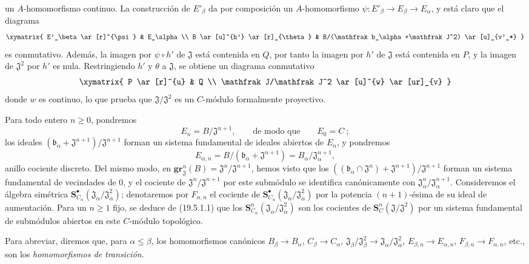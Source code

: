 \begin{env}[19.5.6.1]
un $A$-homomorfismo continuo. La construcción de $E'_\beta$ da por
composición un $A$-homomorfismo $\psi:E'_\beta\to E_\beta\to E_\alpha$, y
está claro que el diagrama
\[
  \xymatrix{
    E'_\beta \ar[r]^{\psi} & E_\alpha \\
    B \ar[u]^{h'} \ar[r]_{\theta} &
    B/(\mathfrak b_\alpha+\mathfrak J^2) \ar[u]_{v'_*}
  }
\]
es conmutativo. Además, la imagen por $\psi\circ h'$ de $\mathfrak J$ está
contenida en $Q$, por tanto la imagen por $h'$ de $\mathfrak J$ está contenida en
$P$, y la imagen de $\mathfrak J^2$ por $h'$ es nula. Restringiendo $h'$ y
$\theta$ a $\mathfrak J$, se obtiene un diagrama conmutativo
\[
  \xymatrix{
    P \ar[r]^{u} & Q \\
    \mathfrak J/\mathfrak J^2 \ar[u]^{w} \ar[ur]_{v}
  }
\]
donde $w$ es continuo, lo que prueba que
$\mathfrak J/\mathfrak J^2$ es un $C$-módulo formalmente proyectivo.
\end{env}



\begin{env}[19.5.6.2]
\label{0.19.5.6.2-fr}
Para todo entero $n\geq0$, pondremos
\[
  E_n=B/\mathfrak J^{n+1},
  \qquad\text{de modo que}\qquad E_0=C~;
\]
los ideales $(\mathfrak b_\alpha+\mathfrak J^{n+1})/\mathfrak J^{n+1}$ forman
un sistema fundamental de ideales abiertos de $E_n$, y pondremos
\[
  E_{\alpha,n}=B/(\mathfrak b_\alpha+\mathfrak J^{n+1})
  =B_\alpha/\mathfrak J_\alpha^{n+1},
\]
anillo cociente discreto. Del mismo modo, en
$\mathbf{gr}_{\mathfrak J}^n(B)=\mathfrak J^n/\mathfrak J^{n+1}$, hemos visto que los
$((\mathfrak b_\alpha\cap\mathfrak J^n)+\mathfrak J^{n+1})/
\mathfrak J^{n+1}$ forman un sistema fundamental de vecindades de $0$, y el
cociente de $\mathfrak J^n/\mathfrak J^{n+1}$ por este submódulo se identifica
canónicamente con $\mathfrak J_\alpha^n/\mathfrak J_\alpha^{n+1}$. Consideremos
el álgebra simétrica
$\mathbf S_{C_\alpha}^\bullet(\mathfrak J_\alpha/\mathfrak J_\alpha^2)$; denotaremos
por $F_{\alpha,n}$ el cociente de
$\mathbf S_{C_\alpha}^\bullet(\mathfrak J_\alpha/\mathfrak J_\alpha^2)$ por la
potencia $(n+1)$-ésima de su ideal de aumentación. Para un $n\geq1$ fijo, se
deduce de (19.5.1.1) que los
$\mathbf S_{C_\alpha}^n(\mathfrak J_\alpha/\mathfrak J_\alpha^2)$ son los
cocientes de $\mathbf S_C^n(\mathfrak J/\mathfrak J^2)$ por un sistema
fundamental de submódulos abiertos en este $C$-módulo topológico.

Para abreviar, diremos que, para $\alpha\leq\beta$, los homomorfismos canónicos
$B_\beta\to B_\alpha$, $C_\beta\to C_\alpha$,
$\mathfrak J_\beta/\mathfrak J_\beta^2\to
\mathfrak J_\alpha/\mathfrak J_\alpha^2$, $E_{\beta,n}\to E_{\alpha,n}$,
$F_{\beta,n}\to F_{\alpha,n}$, etc., son los \emph{homomorfismos de
transición}.
\end{env}

